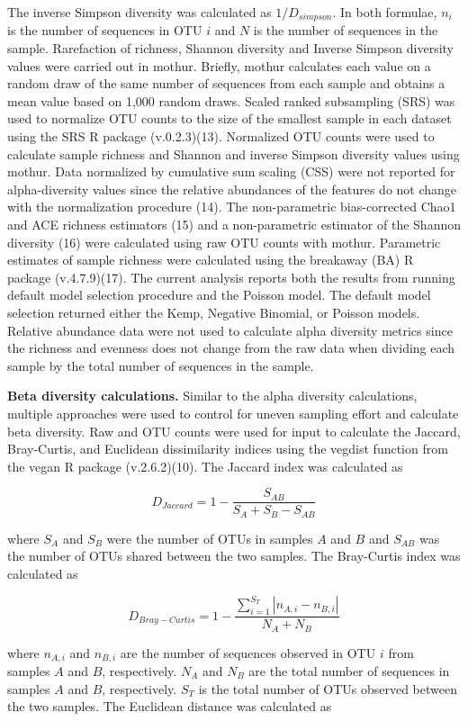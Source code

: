 \documentclass[
]{article}
\begin{document}
The inverse Simpson diversity was calculated as \(1/D_{simpson}\). In
both formulae, \(n_i\) is the number of sequences in OTU \(i\) and \(N\)
is the number of sequences in the sample. Rarefaction of richness,
Shannon diversity and Inverse Simpson diversity values were carried out
in mothur. Briefly, mothur calculates each value on a random draw of the
same number of sequences from each sample and obtains a mean value based
on 1,000 random draws. Scaled ranked subsampling (SRS) was used to
normalize OTU counts to the size of the smallest sample in each dataset
using the SRS R package (v.0.2.3)(13). Normalized OTU counts were used
to calculate sample richness and Shannon and inverse Simpson diversity
values using mothur. Data normalized by cumulative sum scaling (CSS)
were not reported for alpha-diversity values since the relative
abundances of the features do not change with the normalization
procedure (14). The non-parametric bias-corrected Chao1 and ACE richness
estimators (15) and a non-parametric estimator of the Shannon diversity
(16) were calculated using raw OTU counts with mothur. Parametric
estimates of sample richness were calculated using the breakaway (BA) R
package (v.4.7.9)(17). The current analysis reports both the results
from running default model selection procedure and the Poisson model.
The default model selection returned either the Kemp, Negative Binomial,
or Poisson models. Relative abundance data were not used to calculate
alpha diversity metrics since the richness and evenness does not change
from the raw data when dividing each sample by the total number of
sequences in the sample.

\textbf{Beta diversity calculations.} Similar to the alpha diversity
calculations, multiple approaches were used to control for uneven
sampling effort and calculate beta diversity. Raw and OTU counts were
used for input to calculate the Jaccard, Bray-Curtis, and Euclidean
dissimilarity indices using the vegdist function from the vegan R
package (v.2.6.2)(10). The Jaccard index was calculated as

\[D_{Jaccard}=1-\frac{S_{AB}}{S_A+S_B-S_{AB}}\]

where \(S_A\) and \(S_B\) were the number of OTUs in samples \(A\) and
\(B\) and \(S_{AB}\) was the number of OTUs shared between the two
samples. The Bray-Curtis index was calculated as

\[D_{Bray-Curtis}=1-\frac{\sum_{i=1}^{S_T} \left| n_{A,i} - n_{B,i}\right| }{ N_A + N_B}\]

where \(n_{A,i}\) and \(n_{B,i}\) are the number of sequences observed
in OTU \(i\) from samples \(A\) and \(B\), respectively. \(N_A\) and
\(N_B\) are the total number of sequences in samples \(A\) and \(B\),
respectively. \(S_T\) is the total number of OTUs observed between the
two samples. The Euclidean distance was calculated as
\end{document}
